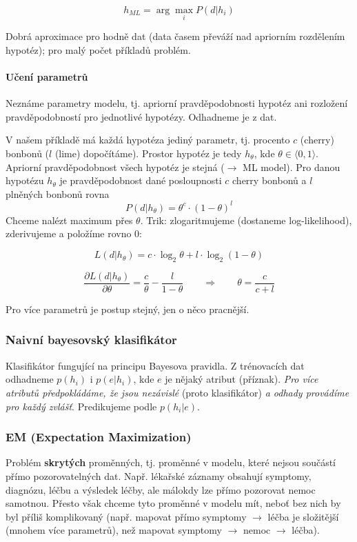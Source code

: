\documentclass[11pt]{report} %
\numberwithin{equation}{section}
\begin{document}
$$h_{ML} = \arg\max_i P(d|h_i)$$

Dobrá aproximace pro hodně dat (data časem převáží nad apriorním rozdělením hypotéz); pro malý počet příkladů problém.

\paragraph{Učení parametrů}
Neznáme parametry modelu, tj. apriorní pravděpodobnosti hypotéz ani rozložení pravděpodobností pro jednotlivé hypotézy. Odhadneme je z dat.

V našem příkladě má každá hypotéza jediný parametr, tj. procento $c$ (cherry) bonbonů ($l$ (lime) dopočítáme). Prostor hypotéz je tedy $h_\theta$, kde $\theta \in \langle 0,1 \rangle$. Apriorní pravděpodobnost všech hypotéz je stejná ($\to$ ML model). Pro danou hypotézu $h_\theta$ je pravděpodobnost dané posloupnosti $c$ cherry bonbonů a $l$ plněných bonbonů rovna
$$P(d|h_\theta) = \theta^c \cdot (1-\theta)^l$$
Chceme nalézt maximum přes $\theta$. Trik: zlogaritmujeme (dostaneme log-likelihood), zderivujeme a položíme rovno 0:

$$L(d|h_\theta) = c\cdot \log_2\theta + l\cdot\log_2(1-\theta)$$

$$\frac{\partial L(d|h_\theta)}{\partial \theta} = \frac{c}{\theta} - \frac{l}{1-\theta}
\qquad \Rightarrow \qquad
\theta = \frac{c}{c+l}$$

Pro více parametrů je postup stejný, jen o něco pracnější.


\subsubsection{Naivní bayesovský klasifikátor}
Klasifikátor fungující na principu Bayesova pravidla. Z trénovacích dat odhadneme $p(h_i)$ i $p(e|h_i)$, kde $e$ je nějaký atribut (příznak). \textit{Pro více atributů předpokládáme, že jsou nezávislé} (proto  klasifikátor) \textit{a odhady provádíme pro každý zvlášť}. Predikujeme podle $p(h_i|e)$. 


\subsubsection{EM (Expectation Maximization)}
Problém \textbf{skrytých} proměnných, tj. proměnné v modelu, které nejsou součástí přímo pozorovatelných dat. Např. lékařské záznamy obsahují symptomy, diagnózu, léčbu a výsledek léčby, ale málokdy lze přímo pozorovat nemoc samotnou. Přesto však chceme tyto proměnné v modelu mít, neboť bez nich by byl příliš komplikovaný (např. mapovat přímo symptomy $\to$ léčba je složitější (mnohem více parametrů), než mapovat symptomy $\to$ nemoc $\to$ léčba). 
\end{document}
